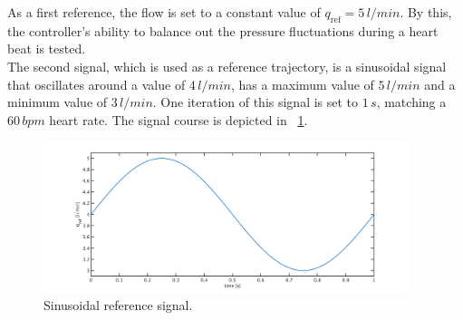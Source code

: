 As a first reference, the flow is set to a constant value of $q_{\mathrm{ref}}=5\,l/min$. By this, the controller's ability to balance out the pressure fluctuations during a heart beat is tested.
\\The second signal, which is used as a reference trajectory, is a sinusoidal signal that oscillates around a value of $4\, l/min$, has a maximum value of $5\, l/min$ and a minimum value of $3\, l/min$. One iteration of this signal is set to $1\,s$, matching a $60\,bpm$ heart rate. The signal course is depicted in \figurename~\ref{fig:ref_sine}.
\begin{figure}[ht]
  \centering
  \includegraphics[width=0.95\textwidth]{images/chapt_5/ILC/ref_sine.pdf}
  \caption[Sinusoidal reference signal]{Sinusoidal reference signal.}
  \label{fig:ref_sine}
\end{figure}

